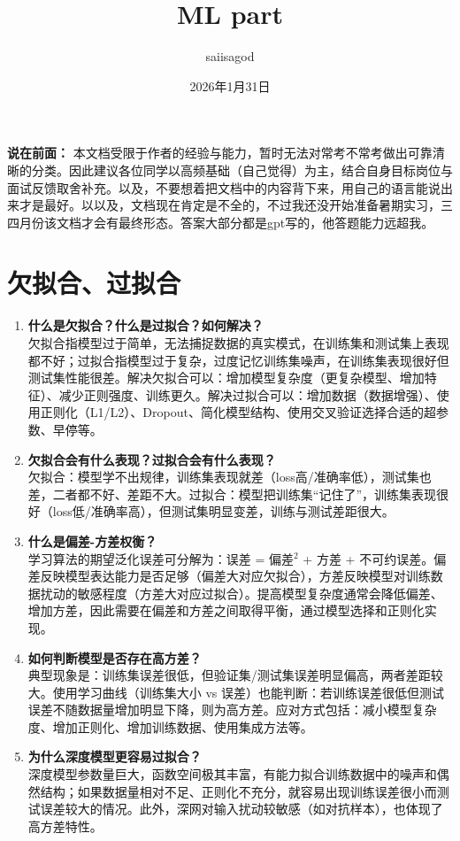 \documentclass{article}
\title{ML part}
\author{saiisagod}
\date{2026年1月31日}
\begin{document}
\maketitle

\noindent\textbf{说在前面：}
本文档受限于作者的经验与能力，暂时无法对常考不常考做出可靠清晰的分类。因此建议各位同学以高频基础（自己觉得）为主，结合自身目标岗位与面试反馈取舍补充。以及，不要想着把文档中的内容背下来，用自己的语言能说出来才是最好。以以及，文档现在肯定是不全的，不过我还没开始准备暑期实习，三四月份该文档才会有最终形态。答案大部分都是gpt写的，他答题能力远超我。

\section{欠拟合、过拟合}
\begin{enumerate}
\item \textbf{什么是欠拟合？什么是过拟合？如何解决？}\\
欠拟合指模型过于简单，无法捕捉数据的真实模式，在训练集和测试集上表现都不好；过拟合指模型过于复杂，过度记忆训练集噪声，在训练集表现很好但测试集性能很差。解决欠拟合可以：增加模型复杂度（更复杂模型、增加特征）、减少正则强度、训练更久。解决过拟合可以：增加数据（数据增强）、使用正则化（L1/L2）、Dropout、简化模型结构、使用交叉验证选择合适的超参数、早停等。

\item \textbf{欠拟合会有什么表现？过拟合会有什么表现？}\\
欠拟合：模型学不出规律，训练集表现就差（loss高/准确率低），测试集也差，二者都不好、差距不大。过拟合：模型把训练集“记住了”，训练集表现很好（loss低/准确率高），但测试集明显变差，训练与测试差距很大。

\item \textbf{什么是偏差-方差权衡？}\\
学习算法的期望泛化误差可分解为：误差 = 偏差$^2$ + 方差 + 不可约误差。偏差反映模型表达能力是否足够（偏差大对应欠拟合），方差反映模型对训练数据扰动的敏感程度（方差大对应过拟合）。提高模型复杂度通常会降低偏差、增加方差，因此需要在偏差和方差之间取得平衡，通过模型选择和正则化实现。

\item \textbf{如何判断模型是否存在高方差？}\\
典型现象是：训练集误差很低，但验证集/测试集误差明显偏高，两者差距较大。使用学习曲线（训练集大小 vs 误差）也能判断：若训练误差很低但测试误差不随数据量增加明显下降，则为高方差。应对方式包括：减小模型复杂度、增加正则化、增加训练数据、使用集成方法等。

\item \textbf{为什么深度模型更容易过拟合？}\\
深度模型参数量巨大，函数空间极其丰富，有能力拟合训练数据中的噪声和偶然结构；如果数据量相对不足、正则化不充分，就容易出现训练误差很小而测试误差较大的情况。此外，深网对输入扰动较敏感（如对抗样本），也体现了高方差特性。
\end{enumerate}
\end{document}
